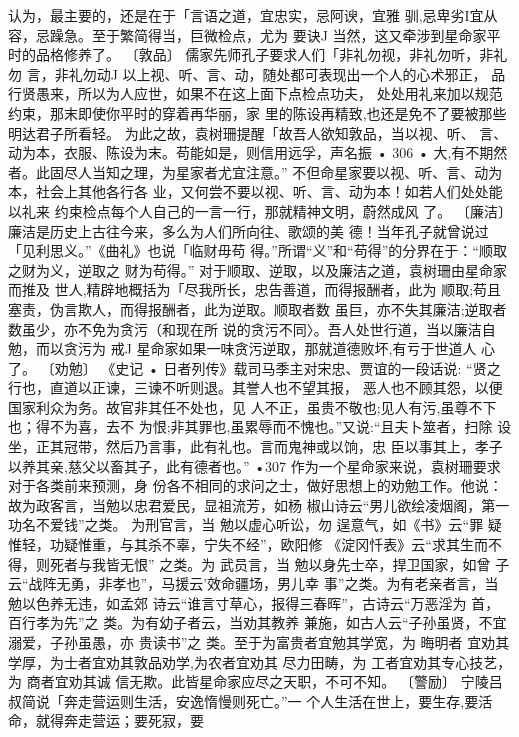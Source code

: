 认为，最主要的，还是在于「言语之道，宜忠实，忌阿谀，宜雅
驯,忌卑劣I宜从容，忌躁急。至于繁简得当，巨微检点，尤为
要诀J
当然，这又牵涉到星命家平时的品格修养了。
〔敦品〕
儒家先师孔子要求人们「非礼勿视，非礼勿听，非礼勿
言，非礼勿动J
以上视、听、言、动，随处都可表现出一个人的心术邪正，
品行贤愚来，所以为人应世，如果不在这上面下点检点功夫，
处处用礼来加以规范约束，那末即使你平时的穿着再华丽，家
里的陈设再精致,也还是免不了要被那些明达君子所看轻。
为此之故，袁树珊提醒「故吾人欲知敦品，当以视、听、
言、动为本，衣服、陈设为末。苟能如是，则信用远孚，声名振
• 306 •
大,有不期然者。此固尽人当知之理，为星家者尤宜注意。”
不但命星家要以视、听、言、动为本，社会上其他各行各
业，又何尝不要以视、听、言、动为本！如若人们处处能以礼来
约束检点每个人自己的一言一行，那就精神文明，蔚然成风
了。
〔廉洁〕
廉洁是历史上古往今来，多么为人们所向往、歌颂的美
德！当年孔子就曾说过「见利思义。”《曲礼》也说「临财毋苟
得。”所谓“义”和“苟得”的分界在于：“顺取之财为义，逆取之
财为苟得。”
对于顺取、逆取，以及廉洁之道，袁树珊由星命家而推及
世人,精辟地概括为「尽我所长，忠告善道，而得报酬者，此为
顺取;苟且塞责，伪言欺人，而得报酬者，此为逆取。顺取者数
虽巨，亦不失其廉洁;逆取者数虽少，亦不免为贪污（和现在所
说的贪污不同〉。吾人处世行道，当以廉洁自勉，而以贪污为
戒J
星命家如果一味贪污逆取，那就道德败坏,有亏于世道人
心了。
〔劝勉〕
《史记 • 日者列传》载司马季主对宋忠、贾谊的一段话说:
“贤之行也，直道以正谏，三谏不听则退。其誉人也不望其报，
恶人也不顾其怨，以便国家利众为务。故官非其任不处也，见
人不正，虽贵不敬也;见人有污,虽尊不下也；得不为喜，去不
为恨;非其罪也,虽累辱而不愧也。”又说:“且夫卜筮者，扫除
设坐，正其冠带，然后乃言事，此有礼也。言而鬼神或以饷，忠
臣以事其上，孝子以养其亲,慈父以畜其子，此有德者也。”
•307
作为一个星命家来说，袁树珊要求对于各类前来预测，身
份各不相同的求问之士，做好思想上的劝勉工作。他说：
故为政客言，当勉以忠君爱民，显祖流芳，如杨
椒山诗云“男儿欲绘凌烟阁，第一功名不爱钱”之类。
为刑官言，当 勉以虚心听讼，勿 逞意气，如《书》云“罪
疑惟轻，功疑惟重，与其杀不辜，宁失不经”，欧阳修
《淀冈忏表》云“求其生而不得，则死者与我皆无恨”
之类。为 武员言，当 勉以身先士卒，捍卫国家，如曾
子云“战阵无勇，非孝也”，马援云'效命疆场，男儿幸
事”之类。为有老亲者言，当勉以色养无违，如孟郊
诗云“谁言寸草心，报得三春晖”，古诗云“万恶淫为
首，百行孝为先”之 类。为有幼子者云，当劝其教养
兼施，如古人云“子孙虽贤，不宜 溺爱，子孙虽愚，亦
贵读书”之 类。至于为富贵者宜勉其学宽，为 晦明者
宜劝其学厚，为士者宜劝其敦品劝学,为农者宜劝其
尽力田畴，为 工者宜劝其专心技艺，为 商者宜劝其诚
信无欺。此皆星命家应尽之天职，不可不知。
〔警励〕
宁陵吕叔简说「奔走营运则生活，安逸惰慢则死亡。”一
个人生活在世上，要生存,要活命，就得奔走营运；要死寂，要
